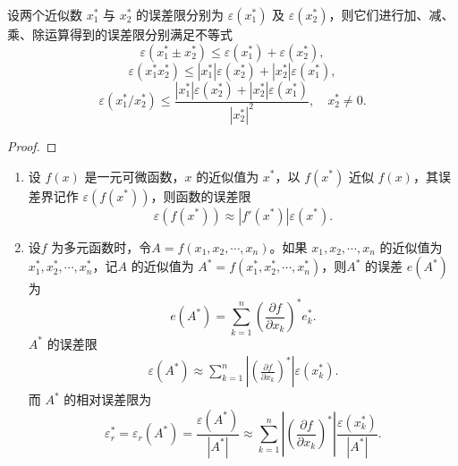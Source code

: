 \documentclass[../../main.tex]{subfiles}
\begin{document}
\begin{theorem}
设两个近似数 $x_1^*$ 与 $x_2^*$ 的误差限分别为 $\varepsilon(x_1^*)$ 及 $\varepsilon(x_2^*)$，则它们进行加、减、乘、除运算得到的误差限分别满足不等式 
\[
\varepsilon(x_1^* \pm x_2^*) \leqslant \varepsilon(x_1^*) + \varepsilon(x_2^*),
\]
\[
\varepsilon(x_1^* x_2^*) \leqslant | x_1^* | \varepsilon(x_2^*) + | x_2^* | \varepsilon(x_1^*),
\]
\[
\varepsilon(x_1^* / x_2^*) \leqslant \frac{| x_1^* | \varepsilon(x_2^*) + | x_2^* | \varepsilon(x_1^*)}{| x_2^* |^2}, \quad x_2^* \neq 0.
\]
\end{theorem}
\begin{proof}

\end{proof}

\begin{theorem}
\begin{enumerate}
\item 设 $f(x)$ 是一元可微函数，$x$ 的近似值为 $x^*$，以 $f(x^*)$ 近似 $f(x)$，其误差界记作 $\varepsilon(f(x^*))$，则函数的误差限 
\[
\varepsilon(f(x^*)) \approx | f'(x^*) | \varepsilon(x^*).
\]

\item 设$f$ 为多元函数时，令$A = f(x_1, x_2, \cdots, x_n)$。如果 $x_1, x_2, \cdots, x_n$ 的近似值为 $x_1^*, x_2^*, \cdots, x_n^*$，记$A$ 的近似值为 $A^* = f(x_1^*, x_2^*, \cdots, x_n^*)$，则$A^*$ 的误差 $e(A^*)$ 为 
\[
e(A^*) =\sum_{k=1}^n \left( \frac{\partial f}{\partial x_k} \right)^* e_k^*.
\]
$A^*$ 的误差限 
\begin{align}
\varepsilon(A^*) \approx \sum_{k=1}^n \left| \left( \frac{\partial f}{\partial x_k} \right)^* \right| \varepsilon(x_k^*) .\label{eq:::---20...3}
\end{align}
而 $A^*$ 的相对误差限为 
\[
\varepsilon_r^* = \varepsilon_r(A^*) = \frac{\varepsilon(A^*)}{| A^* |} \approx \sum_{k=1}^n \left| \left( \frac{\partial f}{\partial x_k} \right)^* \right| \frac{\varepsilon(x_k^*)}{| A^* |} .
\]
\end{enumerate}
\end{theorem}
\end{document}
